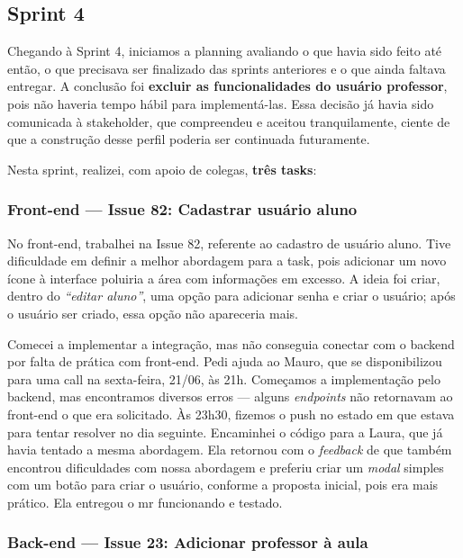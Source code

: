 \subsection{Sprint 4}

Chegando à Sprint 4, iniciamos a planning avaliando o que havia sido feito até então,
o que precisava ser finalizado das sprints anteriores e o que ainda faltava entregar.
A conclusão foi \textbf{excluir as funcionalidades do usuário professor}, pois não
haveria tempo hábil para implementá-las. Essa decisão já havia sido comunicada à
stakeholder, que compreendeu e aceitou tranquilamente, ciente de que a construção
desse perfil poderia ser continuada futuramente.

Nesta sprint, realizei, com apoio de colegas, \textbf{três tasks}:

\subsubsection*{Front-end --- Issue 82: Cadastrar usuário aluno}

No front-end, trabalhei na Issue 82, referente ao cadastro de usuário aluno. Tive
dificuldade em definir a melhor abordagem para a task, pois adicionar um novo ícone
à interface poluiria a área com informações em excesso. A ideia foi criar, dentro do
\textit{``editar aluno''}, uma opção para adicionar senha e criar o usuário; após o
usuário ser criado, essa opção não apareceria mais.

Comecei a implementar a integração, mas não conseguia conectar com o backend por
falta de prática com front-end. Pedi ajuda ao Mauro, que se disponibilizou para uma
call na sexta-feira, 21/06, às 21h. Começamos a implementação pelo backend, mas
encontramos diversos erros --- alguns \textit{endpoints} não retornavam ao front-end
o que era solicitado. Às 23h30, fizemos o push no estado em que estava para tentar
resolver no dia seguinte. Encaminhei o código para a Laura, que já havia tentado a
mesma abordagem. Ela retornou com o \textit{feedback} de que também encontrou
dificuldades com nossa abordagem e preferiu criar um \textit{modal} simples com um
botão para criar o usuário, conforme a proposta inicial, pois era mais prático. Ela
entregou o \ac{mr} funcionando e testado.

\subsubsection*{Back-end --- Issue 23: Adicionar professor à aula}

